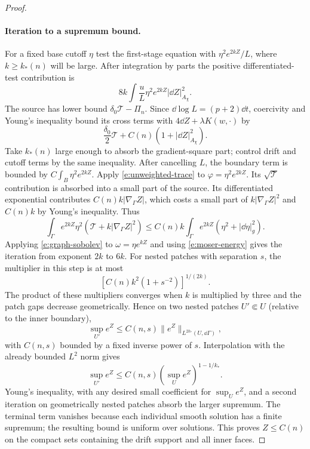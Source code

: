 \begin{proof}
\paragraph{Iteration to a supremum bound.}
For a fixed base cutoff $\eta$ test the first-stage equation with
$\eta^2e^{2kZ}/L$, where $k\ge k_*(n)$ will be large.  After integration
by parts the positive differentiated-test contribution is
\[
 8k\int \frac{u}{L}\eta^2e^{2kZ}|\dd Z|_{A_\chi}^2.
\]
The source has lower bound $\delta_0\mathcal T-\Pi_n$.
Since $\dd\log L=(p+2)\dd t$, coercivity and Young's inequality bound
its cross terms with $4\dd Z+\lambda K(w,\cdot)$ by
\[
 \frac{\delta_0}{2}\mathcal T+
                  C(n)(1+|\dd Z|_{A_\chi}^2).
\]
Take $k_*(n)$ large enough to absorb the gradient-square part;
control drift and cutoff terms by the same inequality.  After
cancelling $L$, the boundary term is bounded by
$C\int_B\eta^2e^{2kZ}$.  Apply \eqref{e:unweighted-trace} to
$\varphi=\eta^2e^{2kZ}$.  Its $\sqrt{\mathcal T}$ contribution is
absorbed into a small part of the source.  Its differentiated
exponential contributes $C(n)k|\nabla_\Gamma Z|$, which costs a
small part of $k|\nabla_\Gamma Z|^2$ and $C(n)k$ by Young's
inequality.  Thus
\begin{equation}\label{e:moser-energy}
 \int_\Gamma e^{2kZ}\eta^2
          (\mathcal T+k|\nabla_\Gamma Z|^2)
 \le C(n)k\int_\Gamma e^{2kZ}
                              (\eta^2+|\dd\eta|_g^2).
\end{equation}
Applying \eqref{e:graph-sobolev} to $\omega=\eta e^{kZ}$ and using
\eqref{e:moser-energy} gives the iteration from exponent $2k$ to
$6k$.  For nested patches with separation $s$, the multiplier in
this step is at most
\[
 [C(n)k^2(1+s^{-2})]^{1/(2k)}.
\]
The product of these multipliers converges when $k$ is multiplied by
three and the patch gaps decrease geometrically.  Hence on two nested
patches $U'\Subset U$ (relative to the inner boundary),
\[
 \sup_{U'}e^Z\le C(n,s)
                  \|e^Z\|_{L^{2k_*}(U,\dd\Gamma)},
\]
with $C(n,s)$ bounded by a fixed inverse power of $s$.
Interpolation with the already bounded $L^2$ norm gives
\[
 \sup_{U'}e^Z\le C(n,s)
             (\sup_Ue^Z)^{1-1/k_*}.
\]
Young's inequality, with any desired small coefficient for
$\sup_Ue^Z$, and a second iteration on geometrically nested patches
absorb the larger supremum.  The terminal term vanishes because each
individual smooth solution has a finite supremum; the resulting bound
is uniform over solutions.  This proves $Z\le C(n)$ on the compact
sets containing the drift support and all inner faces.


\end{proof}
